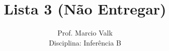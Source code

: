\documentclass[10pt,brazil,addpoints]{exam}
\begin{document}
\title{Lista 3 (Não Entregar)}


\author{
  Prof. Marcio Valk \\
  Disciplina: Inferência B\\
  \date{}
}


\maketitle
\end{document}
